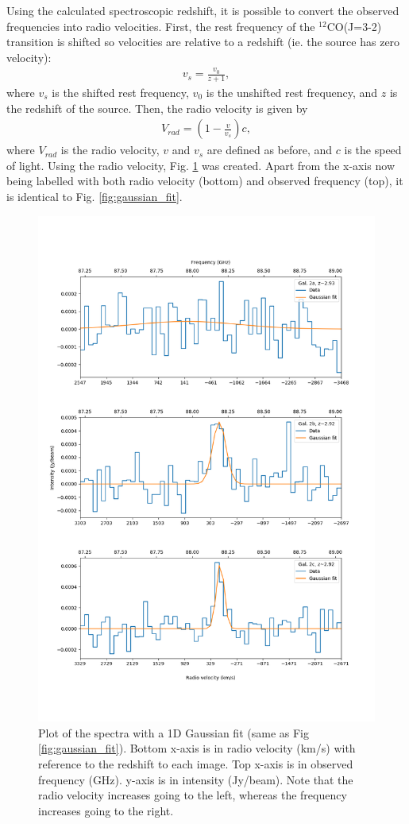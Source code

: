\documentclass[11pt]{article}
\begin{document}
Using the calculated spectroscopic redshift, it is possible to convert the observed frequencies into radio velocities. First, the rest frequency of the $^{12}$CO(J=3-2) transition is shifted so velocities are relative to a redshift (ie. the source has zero velocity):
\begin{align}\label{eqn:restfreq_shift}
	v_s = \frac{v_0}{z+1},
\end{align}
where $v_s$ is the shifted rest frequency, $v_0$ is the unshifted rest frequency, and $z$ is the redshift of the source. Then, the radio velocity is given by 
\begin{align}\label{eqn:radio_vel}
	V_{rad} = (1 - \frac{v}{v_s})c,
\end{align}
where $V_{rad}$ is the radio velocity, $v$ and $v_s$ are defined as before, and $c$ is the speed of light. Using the radio velocity, Fig. \ref{fig:velocity_axis} was created. Apart from the x-axis now being labelled with both radio velocity (bottom) and observed frequency (top), it is identical to Fig. \ref{fig:gaussian_fit}.

\begin{figure}[!htbp]
    \centering
    \includegraphics[width=0.8\linewidth]{../figs/velocity_axis_plot.png}
	\caption{Plot of the spectra with a 1D Gaussian fit (same as Fig \ref{fig:gaussian_fit}). Bottom x-axis is in radio velocity (km/s) with reference to the redshift to each image. Top x-axis is in observed frequency (GHz). y-axis is in intensity (Jy/beam). Note that the radio velocity increases going to the left, whereas the frequency increases going to the right.}
	\label{fig:velocity_axis}
\end{figure}
\end{document}
